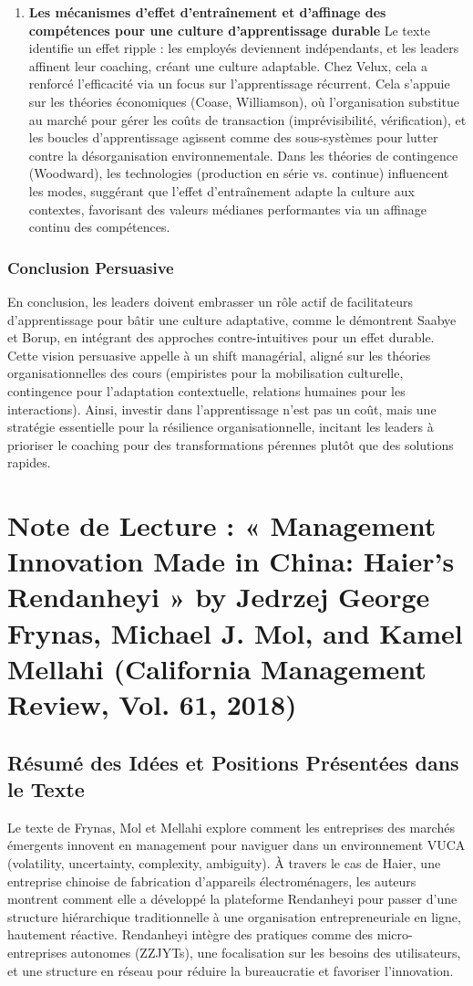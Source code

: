 \documentclass{rapportECL}
\begin{document}
\begin{enumerate}
\item \textbf{Les mécanismes d'effet d'entraînement et d'affinage des compétences pour une culture d'apprentissage durable}  
Le texte identifie un effet ripple : les employés deviennent indépendants, et les leaders affinent leur coaching, créant une culture adaptable. Chez Velux, cela a renforcé l'efficacité via un focus sur l'apprentissage récurrent. Cela s'appuie sur les théories économiques (Coase, Williamson), où l'organisation substitue au marché pour gérer les coûts de transaction (imprévisibilité, vérification), et les boucles d'apprentissage agissent comme des sous-systèmes pour lutter contre la désorganisation environnementale. Dans les théories de contingence (Woodward), les technologies (production en série vs. continue) influencent les modes, suggérant que l'effet d'entraînement adapte la culture aux contextes, favorisant des valeurs médianes performantes via un affinage continu des compétences.
\end{enumerate}

\subsubsection{Conclusion Persuasive}
En conclusion, les leaders doivent embrasser un rôle actif de facilitateurs d'apprentissage pour bâtir une culture adaptative, comme le démontrent Saabye et Borup, en intégrant des approches contre-intuitives pour un effet durable. Cette vision persuasive appelle à un shift managérial, aligné sur les théories organisationnelles des cours (empiristes pour la mobilisation culturelle, contingence pour l'adaptation contextuelle, relations humaines pour les interactions). Ainsi, investir dans l'apprentissage n'est pas un coût, mais une stratégie essentielle pour la résilience organisationnelle, incitant les leaders à prioriser le coaching pour des transformations pérennes plutôt que des solutions rapides.

\section{Note de Lecture : « Management Innovation Made in China: Haier’s Rendanheyi » by Jedrzej George Frynas, Michael J. Mol, and Kamel Mellahi (California Management Review, Vol. 61, 2018)}

\subsection{Résumé des Idées et Positions Présentées dans le Texte}
Le texte de Frynas, Mol et Mellahi explore comment les entreprises des marchés émergents innovent en management pour naviguer dans un environnement VUCA (volatility, uncertainty, complexity, ambiguity). À travers le cas de Haier, une entreprise chinoise de fabrication d'appareils électroménagers, les auteurs montrent comment elle a développé la plateforme Rendanheyi pour passer d'une structure hiérarchique traditionnelle à une organisation entrepreneuriale en ligne, hautement réactive. Rendanheyi intègre des pratiques comme des micro-entreprises autonomes (ZZJYTs), une focalisation sur les besoins des utilisateurs, et une structure en réseau pour réduire la bureaucratie et favoriser l'innovation.
\end{document}
